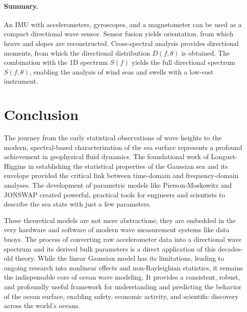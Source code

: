 \documentclass[11pt,letterpaper]{article}
\begin{document}
\paragraph{Summary.}
An IMU with accelerometers, gyroscopes, and a magnetometer can be used as a compact directional wave sensor. Sensor fusion yields orientation, from which heave and slopes are reconstructed. Cross-spectral analysis provides directional moments, from which the directional distribution $D(f,\theta)$ is obtained. The combination with the 1D spectrum $S(f)$ yields the full directional spectrum $S(f,\theta)$, enabling the analysis of wind seas and swells with a low-cost instrument.

\section{Conclusion}
The journey from the early statistical observations of wave heights to the modern, spectral-based characterization of the sea surface represents a profound achievement in geophysical fluid dynamics. The foundational work of Longuet-Higgins in establishing the statistical properties of the Gaussian sea and its envelope provided the critical link between time-domain and frequency-domain analyses. The development of parametric models like Pierson-Moskowitz and JONSWAP created powerful, practical tools for engineers and scientists to describe the sea state with just a few parameters.

These theoretical models are not mere abstractions; they are embedded in the very hardware and software of modern wave measurement systems like data buoys. The process of converting raw accelerometer data into a directional wave spectrum and its derived bulk parameters is a direct application of this decades-old theory. While the linear Gaussian model has its limitations, leading to ongoing research into nonlinear effects and non-Rayleighian statistics, it remains the indispensable core of ocean wave modeling. It provides a consistent, robust, and profoundly useful framework for understanding and predicting the behavior of the ocean surface, enabling safety, economic activity, and scientific discovery across the world's oceans.
\end{document}
